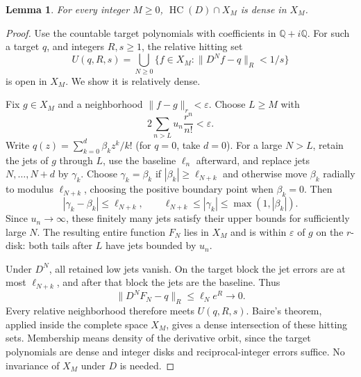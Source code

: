 \documentclass[11pt]{article}
\newtheorem{lemma}{Lemma}
\newcommand{\HC}{\operatorname{HC}}
\newcommand{\norm}[2]{\lVert #1\rVert_{#2}}
\begin{document}
\begin{lemma}\label{lem:density}
For every integer $M\ge0$, $\HC(D)\cap X_M$ is dense in $X_M$.
\end{lemma}
\begin{proof}
Use the countable target polynomials with coefficients in $\mathbb Q+i\mathbb Q$.
For such a target $q$, and integers $R,s\ge1$, the relative hitting set
\[
 U(q,R,s)=\bigcup_{N\ge0}
       \{f\in X_M:\norm{D^Nf-q}{R}<1/s\}
\]
is open in $X_M$. We show it is relatively dense.

Fix $g\in X_M$ and a neighborhood $\norm{f-g}{r}<\varepsilon$.
Choose $L\ge M$ with
\[
                 2\sum_{n>L}u_n\frac{r^n}{n!}<\varepsilon.
\]
Write $q(z)=\sum_{k=0}^d\beta_kz^k/k!$ (for $q=0$, take $d=0$).
For a large $N>L$, retain the jets of $g$ through $L$, use the baseline
$\ell_n$ afterward, and replace jets $N,\ldots,N+d$ by $\gamma_k$.
Choose $\gamma_k=\beta_k$ if $|\beta_k|\ge\ell_{N+k}$ and otherwise
move $\beta_k$ radially to modulus $\ell_{N+k}$, choosing the positive
boundary point when $\beta_k=0$. Then
\[
 |\gamma_k-\beta_k|\le\ell_{N+k},\qquad
 \ell_{N+k}\le|\gamma_k|\le\max(1,|\beta_k|).
\]
Since $u_n\to\infty$, these finitely many jets satisfy their upper bounds
for sufficiently large $N$. The resulting entire function $F_N$ lies in
$X_M$ and is within $\varepsilon$ of $g$ on the $r$-disk: both tails
after $L$ have jets bounded by $u_n$.

Under $D^N$, all retained low jets vanish. On the target block the jet errors
are at most $\ell_{N+k}$, and after that block the jets are the baseline.
Thus
\[
                   \norm{D^NF_N-q}{R}\le \ell_Ne^R\longrightarrow0.
\]
Every relative neighborhood therefore meets $U(q,R,s)$.
Baire's theorem, applied inside the complete space $X_M$, gives a dense
intersection of these hitting sets. Membership means density of the derivative
orbit, since the target polynomials are dense and integer disks and
reciprocal-integer errors suffice. No invariance of $X_M$ under $D$ is needed.
\end{proof}
\end{document}
